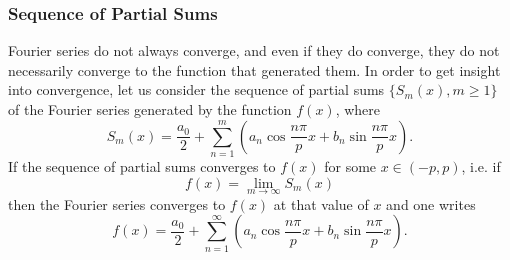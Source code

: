 \documentclass[12pt]{article}
\numberwithin{equation}{section}
\begin{document}
\subsubsection{Sequence of Partial Sums}
Fourier series do not always converge, and even if they do converge, they do not necessarily converge to the function that generated them. In order to get insight into convergence, let us consider the sequence of partial sums
 $\{ S_m(x), m\ge 1 \}$ of the Fourier series generated by the function $f(x)$,
where
\[
S_m(x)=\frac{a_0}{2}+\sum_{n=1}^m (a_n \cos \frac{n\pi}{p}x+b_n \sin \frac{n\pi}{p}x ).
\]
If the sequence of partial sums converges to $f(x)$ for some $x \in (-p,p)$, i.e.
if
$$
\boxed{f(x)=\lim _{m\rightarrow \infty} S_m(x)}
$$
then the Fourier series converges to $f(x)$ at that value of $x$ and one writes
\[
f(x)=\frac{a_0}{2}+\sum_{n=1}^\infty (a_n \cos \frac{n\pi}{p}x+b_n \sin \frac{n\pi}{p}x ).
\]
\end{document}
